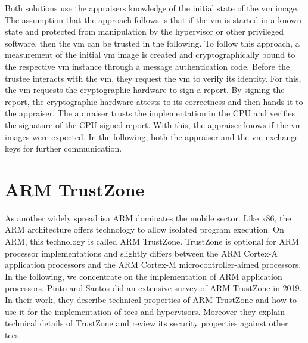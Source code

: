 Both solutions use the appraisers knowledge of the initial state of the \gls{vm}
image. The assumption that the approach follows is that if the \gls{vm} is
started in a known state and protected from manipulation by the hypervisor or
other privileged software, then the \gls{vm} can be trusted in the following. To
follow this approach, a measurement of the initial \gls{vm} image is created and
cryptographically bound to the respective \gls{vm} instance through a message
authentication code. Before the trustee interacts with the \gls{vm}, they
request the \gls{vm} to verify its identity. For this, the \gls{vm} requests the
cryptographic hardware to sign a report. By signing the report, the
cryptographic hardware attests to its correctness and then hands it to the
appraiser. The appraiser trusts the implementation in the CPU and verifies the
signature of the CPU signed report. With this, the appraiser knows if the
\gls{vm} images were expected. In the following, both the appraiser and the
\gls{vm} exchange keys for further communication.\\

\section{ARM TrustZone}
\label{sec:20:trustzone}
As another widely spread \gls{isa} ARM dominates the mobile sector. Like x86,
the ARM architecture offers technology to allow isolated program execution. On
ARM, this technology is called ARM TrustZone. TrustZone is optional for ARM
processor implementations and slightly differs between the ARM Cortex-A
application processors and the ARM Cortex-M microcontroller-aimed processors. In
the following, we concentrate on the implementation of ARM application
processors. Pinto and Santos did an extensive survey of ARM TrustZone in 2019.
In their work, they describe technical properties of ARM TrustZone and how to
use it for the implementation of \glspl{tee} and hypervisors. Moreover they
explain technical details of TrustZone and review its security properties
against other \glspl{tee}.\cite{pinto_demystifying_2019}\\

